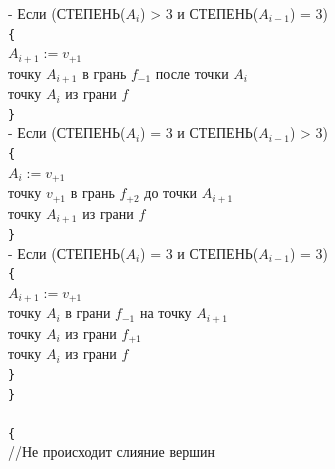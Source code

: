 \documentclass[a4paper,12pt, titlepage]{article}
\begin{document}
\begin{flushleft}
\quad\quad{} - Если (СТЕПЕНЬ($A_{i}$) > 3 и СТЕПЕНЬ($A_{i - 1}$) = 3)\\
\quad\quad\quad\verb"{"\\
\quad\quad\quad\quad$A_{i + 1} := v_{+1}$\\
\quad\quad\quad{} точку $A_{i + 1}$ в грань $f_{-1}$ после точки $A_{i}$\\
\quad\quad\quad{} точку $A_{i}$ из грани $f$\\
\quad\quad\quad\verb"}"\\

\quad\quad{} - Если (СТЕПЕНЬ($A_{i}$) = 3 и СТЕПЕНЬ($A_{i - 1}$) > 3)\\
\quad\quad\quad\verb"{"\\
\quad\quad\quad\quad$A_{i} := v_{+1}$\\
\quad\quad\quad{} точку $v_{+1}$ в грань $f_{+2}$ до точки $A_{i + 1}$\\
\quad\quad\quad{} точку $A_{i + 1}$ из грани $f$\\
\quad\quad\quad\verb"}"\\

\quad\quad{} - Если (СТЕПЕНЬ($A_{i}$) = 3 и СТЕПЕНЬ($A_{i - 1}$) = 3)\\
\quad\quad\quad\verb"{"\\
\quad\quad\quad\quad$A_{i + 1} := v_{+1}$\\
\quad\quad\quad{} точку $A_{i}$ в грани $f_{-1}$ на точку $A_{i + 1}$\\
\quad\quad\quad{} точку $A_{i}$ из грани $f_{+1}$\\
\quad\quad\quad{} точку $A_{i}$ из грани $f$\\
\quad\quad\quad\verb"}"\\

\quad\quad\verb"}"\\
\quad{}\\
\quad\quad\verb"{"\\
\quad\quad\quad//Не происходит слияние вершин\\


\end{flushleft}
\end{document}
